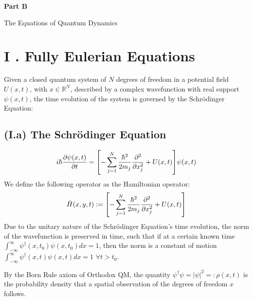 \documentclass[11pt, a4paper]{article} %
\newcommand{\R}{\mathbb{R}} %
\newenvironment{kapituloBerria}[1][]
  {\clearpage           %
   \thispagestyle{empty}%
   \vspace*{\stretch{2}}%
   \raggedleft          %
   {\textbf{{\fontsize{60}{40}\selectfont \hspace{+9.5cm}#1\newline \newline}}}
   \bf
   \fontsize{30}{20}\selectfont
  }
  {\par %
   \vspace{\stretch{3}} %
   \clearpage           %
  }
\begin{document}
\newpage

\begin{kapituloBerria}[Part B]
The Equations of Quantum Dynamics
\end{kapituloBerria}


\section*{I . Fully Eulerian Equations}
Given a closed quantum system of $N$ degrees of freedom in a potential field $U(x, t)$, with $x\in\R^N$, described by a complex wavefunction with real support $\psi(x,t)$, the time evolution of the system is governed by the Schrödinger Equation:

\subsection*{(I.a) The Schrödinger Equation}
\begin{equation}\label{SE}
i\hbar \pdv{\psi(x,t)}{t} = \qty[-\sum_{j=1}^N\frac{\hbar^2}{2m_j}\pdv[2]{}{x_j} + U(x,t)]\psi(x,t)
\end{equation}
We define the following operator as the Hamiltonian operator:
\begin{equation}
\hat{H}(x, y, t):=\qty[-\sum_{j=1}^N\frac{\hbar^2}{2m_j}\pdv[2]{}{x_j} + U(x,t)]
\end{equation}
Due to the unitary nature of the Schrödinger Equation's time evolution, the norm of the wavefunction is preserved in time, such that if at a certain known time $\int^\infty_{-\infty} \psi^\dagger(x,t_0)\psi(x,t_0)dx=1$, then the norm is a constant of motion $\int^\infty_{-\infty} \psi^\dagger(x,t)\psi(x,t)dx=1$ $\forall t>t_0$.

By the Born Rule axiom of Orthodox QM, the quantity $\psi^\dagger\psi=|\psi|^2=:\rho(x,t)$ is the probability density that a spatial observation of the degrees of freedom $x$ follows.
\end{document}
